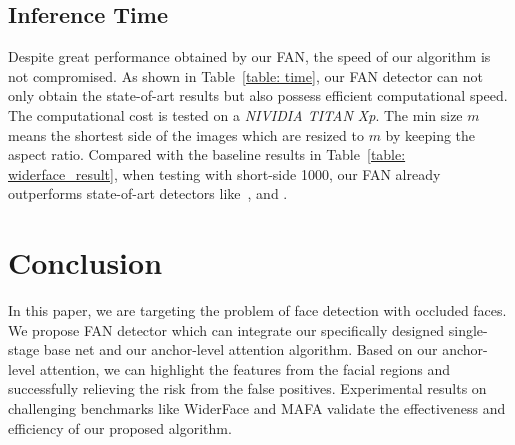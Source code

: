 \documentclass[10pt,twocolumn,letterpaper]{article}
\begin{document}
\subsection{Inference Time}
Despite great performance obtained by our FAN, the speed of our algorithm is not compromised. As shown in Table~\ref{table: time}, our FAN detector can not only obtain the state-of-art results but also possess efficient computational speed. The computational cost is tested on a \emph{NIVIDIA TITAN Xp}. The min size $m$ means the shortest side of the images which are resized to $m$ by keeping the aspect ratio. Compared with the baseline results in Table~\ref{table: widerface_result}, when testing with short-side 1000, our FAN already outperforms state-of-art detectors like~\cite{najibi2017ssh}, \cite{zhang2017s3fd} and \cite{Hu_2017_CVPR}. 

\begin{table}[t]
\begin{center}
\end{center}
\caption{The inference time and precision with respect to different input sizes for our FAN.}
\label{table: time}
\end{table}

\section{Conclusion}
In this paper, we are targeting the problem of face detection with occluded faces. We propose FAN detector which can integrate our specifically designed single-stage base net and our anchor-level attention algorithm. Based on our anchor-level attention, we can highlight the features from the facial regions and successfully relieving the risk from the false positives. Experimental results on challenging benchmarks like WiderFace and MAFA validate the effectiveness and efficiency of our proposed algorithm.

\clearpage
\end{document}

